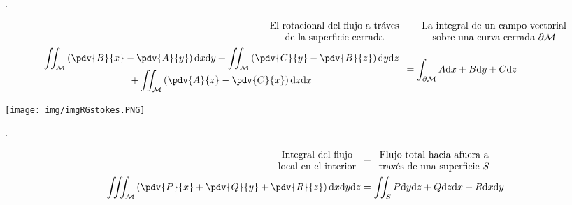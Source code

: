 \documentclass[../main]{subfiles}
\begin{document}
\teorema{\textcolor{red}{Formula de Stokes}}.

\begin{equation}
    \begin{split}
        \begin{array}{c}
            \text{El rotacional del flujo a tráves} \\
            \text{de la superficie cerrada}
        \end{array}
        &=
        \begin{array}{c}
            \text{La integral de un campo vectorial} \\
            \text{sobre una curva cerrada} \ \partial \mathcal{M} 
        \end{array} 
        \\
        \begin{array}{c}
            \displaystyle \iint_{\mathcal{M}} \left(\pdv{B}{x}-\pdv{A}{y}\right)\mathrm{d}x\mathrm{d}y+\iint_{\mathcal{M}} \left(\pdv{C}{y}-\pdv{B}{z}\right)\mathrm{d}y\mathrm{d}z\\
            \displaystyle +\iint_{\mathcal{M}}\left(\pdv{A}{z}-\pdv{C}{x}\right)\mathrm{d}z\mathrm{d}x
        \end{array}
        &=\int_{\partial \mathcal{M}} A\mathrm{d}x+B\mathrm{d}y+C\mathrm{d}z
    \end{split}
\end{equation}

\begin{center}
    \texttt{[image: img/imgRGstokes.PNG]}
\end{center}

\teorema{\textcolor{red}{Teorema de la Divergencia}}.

\begin{equation}
    \begin{split}
        \begin{array}{c}
            \text{Integral del flujo} \\
            \text{local en el interior}
        \end{array}
        &=
        \begin{array}{c}
            \text{Flujo total hacia afuera a} \\
            \text{través de una superficie} \ S
        \end{array} 
        \\
        \iiint_{\mathcal{M}} \left(\pdv{P}{x}+\pdv{Q}{y}+\pdv{R}{z}\right)\mathrm{d}x\mathrm{d}y\mathrm{d}z&=\iint_{S} P\mathrm{d}y\mathrm{d}z+Q\mathrm{d}z\mathrm{d}x+R\mathrm{d}x\mathrm{d}y
    \end{split}
\end{equation}
\end{document}

